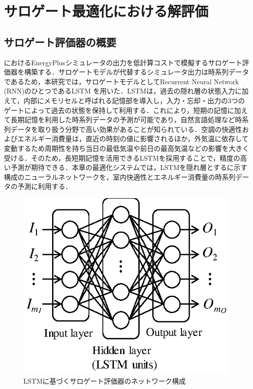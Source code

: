 \section{サロゲート最適化における解評価}\label{sec::surrogate_model}
\subsection{サロゲート評価器の概要}
におけるEnergyPlusシミュレータの出力を低計算コストで模擬するサロゲート評価器を構築する．サロゲートモデルが代替するシミュレータ出力は時系列データであるため，本研究では，サロゲートモデルとしてRecurrent Neural Network (RNN)のひとつであるLSTM \cite{Gers00, Gers01}を用いた．LSTMは，過去の隠れ層の状態入力に加えて，内部にメモリセルと呼ばれる記憶部を導入し，入力・忘却・出力の3つのゲートによって過去の状態を保持して利用する．これにより，短期の記憶に加えて長期記憶を利用した時系列データの予測が可能であり，自然言語処理など時系列データを取り扱う分野で高い効果があることが知られている\cite{Sutskever14}．空調の快適性およびエネルギー消費量は，直近の時刻の値に影響されるほか，外気温に依存して変動するため周期性を持ち当日の最低気温や前日の最高気温などの影響を大きく受ける．そのため，長短期記憶を活用できるLSTMを採用することで，精度の高い予測が期待できる．本章の最適化システムでは，LSTMを隠れ層とするに示す構成のニューラルネットワークを，室内快適性とエネルギー消費量の時系列データの予測に利用する．

\begin{figure}[ht]
  \begin{center}
    \includegraphics[width=0.65\linewidth]{fig/surrogate_nn.eps}
  \end{center}
  \caption{LSTMに基づくサロゲート評価器のネットワーク構成}
  \label{fig::surrogate_nn}
\end{figure}

